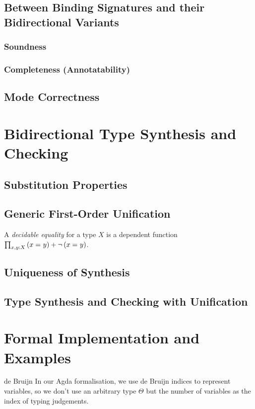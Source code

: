 \documentclass[acmsmall]{acmart}
\theoremstyle{acmdefinition}
\begin{document}
\subsection{Between Binding Signatures and their Bidirectional Variants}
\subsubsection{Soundness}
\subsubsection{Completeness (Annotatability)}
\subsection{Mode Correctness}

\section{Bidirectional Type Synthesis and Checking}

\subsection{Substitution Properties}
\subsection{Generic First-Order Unification}
\cite{McBride2003,McBride2003a}
\begin{definition}
A \emph{decidable equality} for a type $X$ is a dependent function $\prod_{x, y : X} \left(x =_{} y\right) + \neg \left(x =_{} y\right)$.
\end{definition}
 
\subsection{Uniqueness of Synthesis}

\subsection{Type Synthesis and Checking with Unification}

\section{Formal Implementation and Examples}
\begin{LTannote}{de Bruijn}
  In our Agda formalisation, we use de Bruijn indices to represent variables, so we don't use an arbitrary type $\Theta$ but the number of variables as the index of typing judgements.
\end{LTannote}
\end{document}

